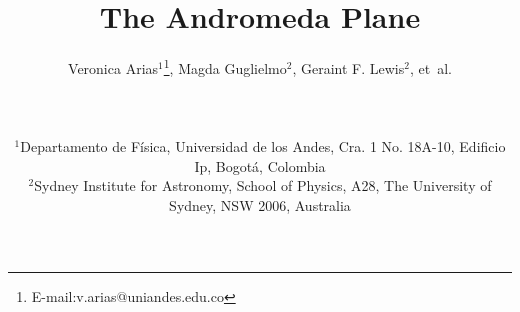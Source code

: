 \documentclass[useAMS,usenatbib]{mn2e}
\begin{document}

\title[The Andromeda plane]{The Andromeda Plane}
\author[Arias et al.]{
{\parbox{\textwidth}{
Veronica Arias$^{1}$\thanks{E-mail:v.arias@uniandes.edu.co}, 
Magda Guglielmo$^2$,
Geraint F. Lewis$^2$, 
et~al.\\}}
\vspace{0.1cm}\\
\parbox{\textwidth}{
$^1$Departamento de F\'isica, Universidad de los Andes, Cra. 1 No. 18A-10, Edificio Ip, Bogot\'a, Colombia\\
$^2$Sydney Institute for Astronomy, School of Physics, A28, The University of Sydney, NSW 2006, Australia \\
}}
\end{document}
